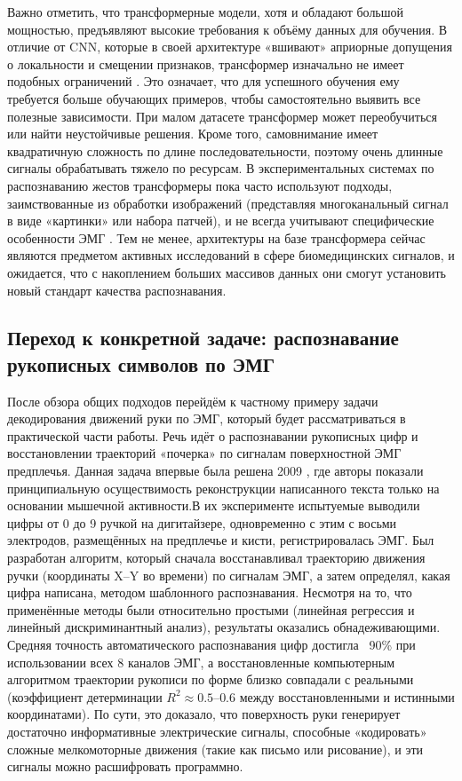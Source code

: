 \documentclass[12pt,a4paper]{article}
\begin{document}
Важно отметить, что трансформерные модели, хотя и обладают большой мощностью, предъявляют высокие требования к объёму данных для обучения. В отличие от CNN, которые в своей архитектуре «вшивают» априорные допущения о локальности и смещении признаков, трансформер изначально не имеет подобных ограничений \cite{33}. Это означает, что для успешного обучения ему требуется больше обучающих примеров, чтобы самостоятельно выявить все полезные зависимости. При малом датасете трансформер может переобучиться или найти неустойчивые решения. Кроме того, самовнимание имеет квадратичную сложность по длине последовательности, поэтому очень длинные сигналы обрабатывать тяжело по ресурсам. В экспериментальных системах по распознаванию жестов трансформеры пока часто используют подходы, заимствованные из обработки изображений (представляя многоканальный сигнал в виде «картинки» или набора патчей), и не всегда учитывают специфические особенности ЭМГ \cite{34}. Тем не менее, архитектуры на базе трансформера сейчас являются предметом активных исследований в сфере биомедицинских сигналов, и ожидается, что с накоплением больших массивов данных они смогут установить новый стандарт качества распознавания.

\subsection*{Переход к конкретной задаче: распознавание рукописных символов по ЭМГ}
После обзора общих подходов перейдём к частному примеру задачи декодирования движений руки по ЭМГ, который будет рассматриваться в практической части работы. Речь идёт о распознавании рукописных цифр и восстановлении траекторий «почерка» по сигналам поверхностной ЭМГ предплечья. Данная задача впервые была решена 2009 \cite{35}, где авторы показали принципиальную осуществимость реконструкции написанного текста только на основании мышечной активности.В их эксперименте испытуемые выводили цифры от 0 до 9 ручкой на дигитайзере, одновременно с этим с восьми электродов, размещённых на предплечье и кисти, регистрировалась ЭМГ. Был разработан алгоритм, который сначала восстанавливал траекторию движения ручки (координаты X–Y во времени) по сигналам ЭМГ, а затем определял, какая цифра написана, методом шаблонного распознавания. Несмотря на то, что применённые методы были относительно простыми (линейная регрессия и линейный дискриминантный анализ), результаты оказались обнадеживающими. Средняя точность автоматического распознавания цифр достигла ~90\% при использовании всех 8 каналов ЭМГ\cite{35}, а восстановленные компьютерным алгоритмом траектории рукописи по форме близко совпадали с реальными (коэффициент детерминации $R^2 \approx 0.5$–$0.6$ между восстановленными и истинными координатами). По сути, это доказало, что поверхность руки генерирует достаточно информативные электрические сигналы, способные «кодировать» сложные мелкомоторные движения (такие как письмо или рисование), и эти сигналы можно расшифровать программно.
\end{document}
